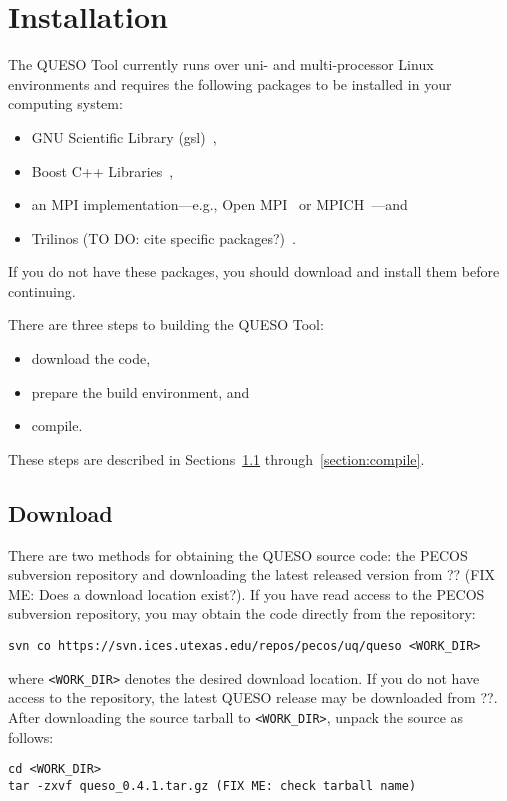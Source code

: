 \chapter{Installation}\label{ch-install}
\thispagestyle{headings}

The QUESO Tool currently runs over uni- and multi-processor Linux
environments and requires the following packages to be installed in
your computing system:
%
\begin{itemize}
\item GNU Scientific Library (gsl)~\cite{gsl},
\item Boost C++ Libraries~\cite{boost}, 
\item an MPI implementation---e.g., Open MPI~\cite{Openmpi} or MPICH~\cite{Mpich}---and
\item Trilinos (TO DO: cite specific packages?)~\cite{Trilinos}.
\end{itemize}
%
If you do not have these packages, you should download and install
them before continuing.

There are three steps to building the QUESO Tool:
%
\begin{itemize}
\item download the code,
\item prepare the build environment, and
\item compile.
\end{itemize}
%
These steps are described in Sections~\ref{section:download}
through~\ref{section:compile}.

\section{Download} \label{section:download}
There are two methods for obtaining the QUESO source code: the PECOS
subversion repository and downloading the latest released version from
?? (FIX ME: Does a download location exist?).  If you have read access
to the PECOS subversion repository, you may obtain the code directly
from the repository:
%
\begin{verbatim}
svn co https://svn.ices.utexas.edu/repos/pecos/uq/queso <WORK_DIR>
\end{verbatim}
%
where \verb+<WORK_DIR>+ denotes the desired download location.  If you
do not have access to the repository, the latest QUESO release may be
downloaded from ??.  After
downloading the source tarball to \verb+<WORK_DIR>+, unpack the source
as follows:
%
\begin{verbatim}
cd <WORK_DIR>
tar -zxvf queso_0.4.1.tar.gz (FIX ME: check tarball name)
\end{verbatim}
%

